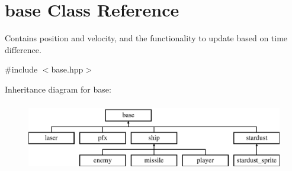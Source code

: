 \hypertarget{classbase}{\section{base Class Reference}
\label{classbase}
}


Contains position and velocity, and the functionality to update based on time difference.  




{\ttfamily \#include $<$base.\-hpp$>$}

Inheritance diagram for base\-:\begin{figure}[H]
\begin{center}
\leavevmode
\includegraphics[height=3.000000cm]{classbase}
\end{center}
\end{figure}
